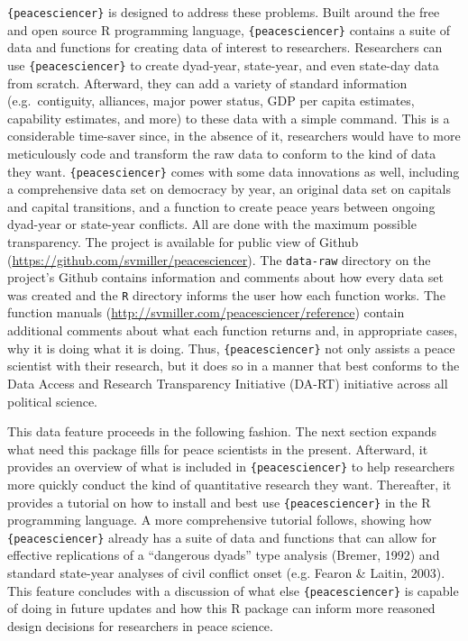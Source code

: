 \documentclass[
  11pt,
]{article}
\begin{document}
\texttt{\{peacesciencer\}} is designed to address these problems. Built around the free and open source R programming language, \texttt{\{peacesciencer\}} contains a suite of data and functions for creating data of interest to researchers. Researchers can use \texttt{\{peacesciencer\}} to create dyad-year, state-year, and even state-day data from scratch. Afterward, they can add a variety of standard information (e.g.~contiguity, alliances, major power status, GDP per capita estimates, capability estimates, and more) to these data with a simple command. This is a considerable time-saver since, in the absence of it, researchers would have to more meticulously code and transform the raw data to conform to the kind of data they want. \texttt{\{peacesciencer\}} comes with some data innovations as well, including a comprehensive data set on democracy by year, an original data set on capitals and capital transitions, and a function to create peace years between ongoing dyad-year or state-year conflicts. All are done with the maximum possible transparency. The project is available for public view of Github (\url{https://github.com/svmiller/peacesciencer}). The \texttt{data-raw} directory on the project's Github contains information and comments about how every data set was created and the \texttt{R} directory informs the user how each function works. The function manuals (\url{http://svmiller.com/peacesciencer/reference}) contain additional comments about what each function returns and, in appropriate cases, why it is doing what it is doing. Thus, \texttt{\{peacesciencer\}} not only assists a peace scientist with their research, but it does so in a manner that best conforms to the Data Access and Research Transparency Initiative (DA-RT) initiative across all political science.

This data feature proceeds in the following fashion. The next section expands what need this package fills for peace scientists in the present. Afterward, it provides an overview of what is included in \texttt{\{peacesciencer\}} to help researchers more quickly conduct the kind of quantitative research they want. Thereafter, it provides a tutorial on how to install and best use \texttt{\{peacesciencer\}} in the R programming language. A more comprehensive tutorial follows, showing how \texttt{\{peacesciencer\}} already has a suite of data and functions that can allow for effective replications of a ``dangerous dyads'' type analysis (Bremer, 1992) and standard state-year analyses of civil conflict onset (e.g. Fearon \& Laitin, 2003). This feature concludes with a discussion of what else \texttt{\{peacesciencer\}} is capable of doing in future updates and how this R package can inform more reasoned design decisions for researchers in peace science.
\end{document}
